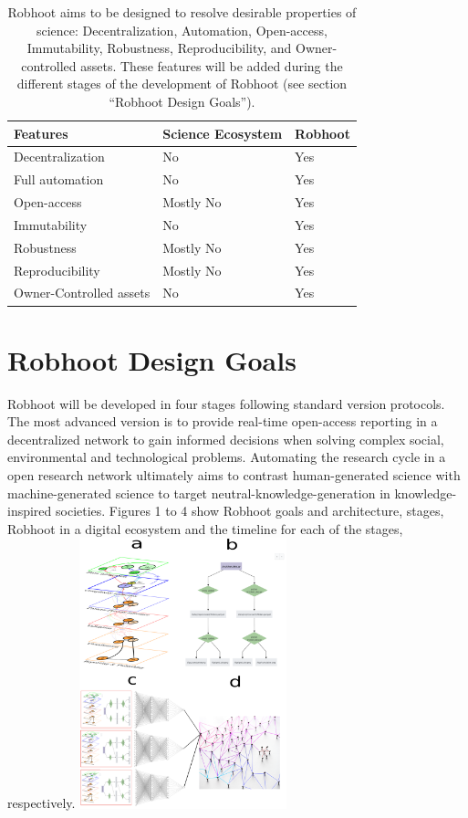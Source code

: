 \documentclass[10pt, a4paper, twocolumn]{article} %
\begin{document}
{\begin{table}
\begin{tabular}{ p{3cm} | p{2cm} | p{2cm}}
  \hline \hline
  \textbf{Features} & \textbf{Science Ecosystem} &\textbf{Robhoot}\\  \hline
  Decentralization & No & Yes \\ \hline
  Full automation & No & Yes \\ \hline
  Open-access & Mostly No & Yes \\ \hline
  Immutability & No & Yes \\ \hline
  Robustness & Mostly No & Yes \\ \hline
  Reproducibility & Mostly No & Yes \\ \hline        
  Owner-Controlled assets & No & Yes \\ \hline       
  \bottomrule

\end{tabular}
\caption{Robhoot aims to be designed to resolve desirable properties
  of science: Decentralization, Automation, Open-access, Immutability,
  Robustness, Reproducibility, and Owner-controlled assets. These
  features will be added during the different stages of the
  development of Robhoot (see section ``Robhoot Design Goals'').}
\end{table}
  \section{Robhoot Design Goals}
  Robhoot will be developed in four stages following standard version
  protocols. The most advanced version is to provide real-time
  open-access reporting in a decentralized network to gain informed
  decisions when solving complex social, environmental and
  technological problems. Automating the research cycle in a open
  research network ultimately aims to contrast human-generated science
  with machine-generated science to target
  neutral-knowledge-generation in knowledge-inspired
  societies. Figures 1 to 4 show Robhoot goals and architecture,
  stages, Robhoot in a digital ecosystem and the timeline for each of
  the stages, respectively.
  \includegraphics[width=0.45\textwidth]{Figure1.pdf}

}
\end{document}
